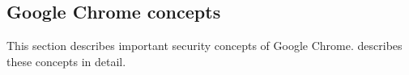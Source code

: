 \subsection{Google Chrome concepts}
This section describes important security concepts of Google Chrome. \cite{chromium_security_architecture} describes these concepts in detail.



